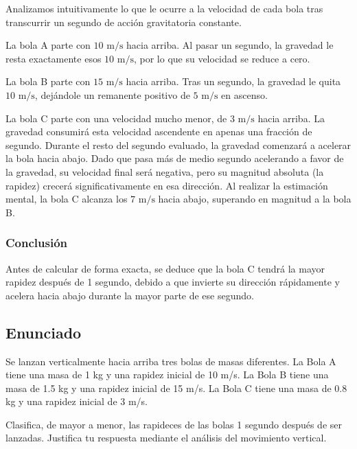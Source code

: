 \documentclass[12pt, a4paper]{article}
\begin{document}
Analizamos intuitivamente lo que le ocurre a la velocidad de cada bola tras transcurrir un segundo de acción gravitatoria constante. 

La bola A parte con $10 \text{ m/s}$ hacia arriba. Al pasar un segundo, la gravedad le resta exactamente esos $10 \text{ m/s}$, por lo que su velocidad se reduce a cero. 

La bola B parte con $15 \text{ m/s}$ hacia arriba. Tras un segundo, la gravedad le quita $10 \text{ m/s}$, dejándole un remanente positivo de $5 \text{ m/s}$ en ascenso.

La bola C parte con una velocidad mucho menor, de $3 \text{ m/s}$ hacia arriba. La gravedad consumirá esta velocidad ascendente en apenas una fracción de segundo. Durante el resto del segundo evaluado, la gravedad comenzará a acelerar la bola hacia abajo. Dado que pasa más de medio segundo acelerando a favor de la gravedad, su velocidad final será negativa, pero su magnitud absoluta (la rapidez) crecerá significativamente en esa dirección. Al realizar la estimación mental, la bola C alcanza los $7 \text{ m/s}$ hacia abajo, superando en magnitud a la bola B.

\subsubsection*{Conclusión}

Antes de calcular de forma exacta, se deduce que la bola C tendrá la mayor rapidez después de 1 segundo, debido a que invierte su dirección rápidamente y acelera hacia abajo durante la mayor parte de ese segundo.

\newpage

\subsection*{Enunciado}

Se lanzan verticalmente hacia arriba tres bolas de masas diferentes. La Bola A tiene una masa de 1 kg y una rapidez inicial de 10 m/s. La Bola B tiene una masa de 1.5 kg y una rapidez inicial de 15 m/s. La Bola C tiene una masa de 0.8 kg y una rapidez inicial de 3 m/s. 

Clasifica, de mayor a menor, las rapideces de las bolas 1 segundo después de ser lanzadas. Justifica tu respuesta mediante el análisis del movimiento vertical.

\vspace{0.5cm}
\end{document}
